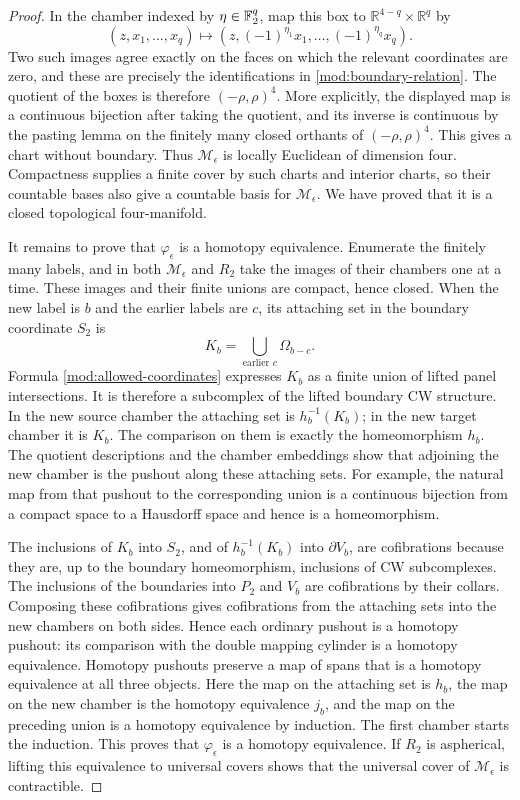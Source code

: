 \begin{proof}
In the chamber indexed by \(\eta\in\mathbb F_2^q\), map this box to
\(\mathbb R^{4-q}\times\mathbb R^q\) by
\[
 (z,x_1,\ldots,x_q)\longmapsto
       (z,(-1)^{\eta_1}x_1,\ldots,(-1)^{\eta_q}x_q).
\]
Two such images agree exactly on the faces on which the relevant
coordinates are zero, and these are precisely the identifications in
\eqref{mod:boundary-relation}.  The quotient of the boxes is therefore
\((-\rho,\rho)^4\).  More explicitly, the displayed map is a continuous
bijection after taking the quotient, and its inverse is continuous by
the pasting lemma on the finitely many closed orthants of
\((-\rho,\rho)^4\).  This gives a chart without boundary.  Thus
\(\mathcal M_\epsilon\) is locally Euclidean of dimension four.
Compactness supplies a finite cover by such charts and interior
charts, so their countable bases also give a countable basis for
\(\mathcal M_\epsilon\).  We have proved that it is a closed
topological four-manifold.

It remains to prove that \(\varphi_\epsilon\) is a homotopy
equivalence.  Enumerate the finitely many labels, and in both
\(\mathcal M_\epsilon\) and \(R_2\) take the images of their chambers
one at a time.  These images and their finite unions are compact,
hence closed.  When the new label is \(b\) and the earlier labels are
\(c\), its attaching set in the boundary coordinate \(S_2\) is
\[
 K_b=\bigcup_{\text{earlier }c}\Omega_{b-c}.
\]
Formula \eqref{mod:allowed-coordinates} expresses \(K_b\) as a finite
union of lifted panel intersections.  It is therefore a subcomplex
of the lifted boundary CW structure.  In the new source chamber the
attaching set is \(h_b^{-1}(K_b)\); in the new target chamber it is
\(K_b\).  The comparison on them is exactly the homeomorphism \(h_b\).
The quotient descriptions and the chamber embeddings show that
adjoining the new chamber is the pushout along these attaching sets.
For example, the natural map from that pushout to the corresponding
union is a continuous bijection from a compact space to a Hausdorff
space and hence is a homeomorphism.

The inclusions of \(K_b\) into \(S_2\), and of \(h_b^{-1}(K_b)\)
into \(\partial V_b\), are cofibrations because they are, up to the
boundary homeomorphism, inclusions of CW subcomplexes.  The inclusions
of the boundaries into \(P_2\) and \(V_b\) are cofibrations by their
collars.  Composing these cofibrations gives cofibrations from the
attaching sets into the new chambers on both sides.  Hence each
ordinary pushout is a homotopy pushout: its comparison with the double
mapping cylinder is a homotopy equivalence.  Homotopy pushouts
preserve a map of spans that is a homotopy equivalence at all three
objects.  Here the map on the attaching set is \(h_b\), the map on
the new chamber is the homotopy equivalence \(j_b\), and the map on
the preceding union is a homotopy equivalence by induction.  The
first chamber starts the induction.  This proves that
\(\varphi_\epsilon\) is a homotopy equivalence.  If \(R_2\) is
aspherical, lifting this equivalence to universal covers shows that
the universal cover of \(\mathcal M_\epsilon\) is contractible.
\end{proof}

